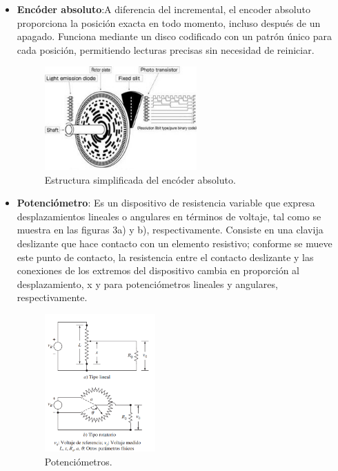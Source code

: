 \begin{itemize}
	
	\item \textbf{Encóder absoluto}:A diferencia del incremental, el encoder absoluto proporciona la posición exacta en todo momento, incluso después de un apagado. Funciona mediante un disco codificado con un patrón único para cada posición, permitiendo lecturas precisas sin necesidad de reiniciar.
	\begin{figure}[H]
		\centering
		\includegraphics[width=0.55\textwidth]{img/encoderabsoluto.jpg}
		\caption{Estructura simplificada del encóder absoluto.}
		\label{fig:encoderabsoluto}
	\end{figure}
	
	
	\item \textbf{Potenciómetro}: Es un dispositivo de resistencia variable que expresa desplazamientos lineales o angulares en términos de voltaje, tal como se muestra en las figuras 3a) y b), respectivamente. Consiste en una clavija deslizante que hace contacto con un elemento resistivo; conforme se mueve este punto de contacto, la resistencia entre el contacto deslizante y las conexiones de los extremos del dispositivo cambia en proporción al desplazamiento, x y  para potenciómetros lineales y angulares, respectivamente.
	\begin{figure}[H]
		\centering
		\includegraphics[width=0.4\textwidth]{img/potenciometro.png}
		\caption{Potenciómetros.}
		\label{fig:potenciometros}
	\end{figure}
	

\end{itemize}
